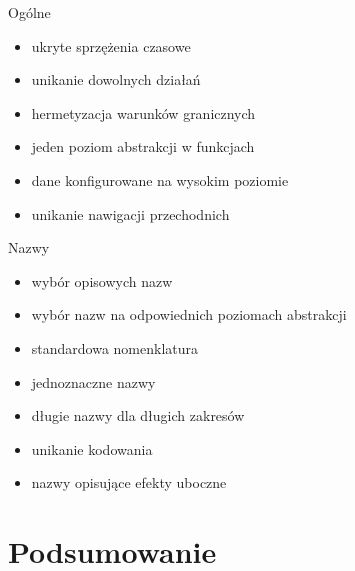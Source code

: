 \begin{frame}{Ogólne}
\begin{itemize}	
	\item ukryte sprzężenia czasowe
	\item unikanie dowolnych działań
	\item hermetyzacja warunków granicznych
	\item jeden poziom abstrakcji w funkcjach
	\item dane konfigurowane na wysokim poziomie
	\item unikanie nawigacji przechodnich
\end{itemize}
\end{frame}

\begin{frame}{Nazwy}
\begin{itemize}	
	\item wybór opisowych nazw
	\item wybór nazw na odpowiednich poziomach abstrakcji
	\item standardowa nomenklatura
	\item jednoznaczne nazwy
	\item długie nazwy dla długich zakresów
	\item unikanie kodowania
	\item nazwy opisujące efekty uboczne
\end{itemize}
\end{frame}

\section{Podsumowanie}

